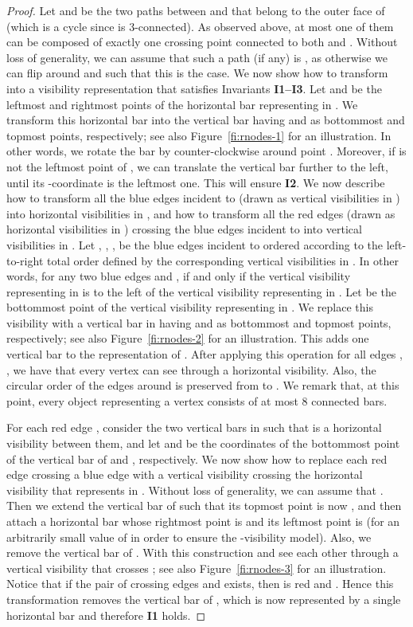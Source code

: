 \documentclass{article}
\begin{document}
\begin{proof}
Let  and  be the two paths between  and  that belong to the outer face of  (which is a cycle since  is 3-connected). As observed above, at most one of them can be composed of exactly one crossing point  connected to both  and .  Without loss of generality, we can assume that such a path (if any) is , as otherwise we can flip  around  and  such that this is the case. We now show how to transform  into a visibility representation  that satisfies Invariants {\bf I1--I3}. Let  and  be the leftmost and rightmost points of the horizontal bar representing  in . We transform this horizontal bar into the vertical bar having  and   as bottommost and topmost points, respectively; see also Figure~\ref{fi:rnodes-1} for an illustration. In other words, we rotate the bar by  counter-clockwise around point . Moreover, if  is not the leftmost point of , we can translate the vertical bar further to the left, until its -coordinate is the leftmost one. This will ensure {\bf I2}. We now describe how to transform all the blue edges incident to  (drawn as vertical visibilities in ) into horizontal visibilities in , and how to transform all the red edges (drawn as horizontal visibilities in ) crossing the blue edges incident to  into vertical visibilities in . Let , , , be the  blue edges incident to  ordered according to the left-to-right total order defined by the corresponding vertical visibilities in . In other words, for any two blue edges  and ,  if and only if the vertical visibility representing   in  is to the left of the vertical visibility representing  in .  Let  be the bottommost point of the vertical visibility representing  in . We replace this visibility with a vertical bar in  having  and  as bottommost and topmost points, respectively; see also Figure~\ref{fi:rnodes-2} for an illustration. This adds one vertical bar to the representation of . After applying this operation for all edges  , , we have that every vertex  can see  through a horizontal visibility. Also, the circular order of the edges around  is preserved from  to . We remark that, at this point, every object representing a vertex consists of at most 8 connected bars.

For each red edge , consider the two vertical bars in  such that  is a horizontal visibility between them, and let  and  be the coordinates of the bottommost point of the vertical bar of  and , respectively. We now show how to replace each red edge  crossing a blue edge  with a vertical visibility crossing the horizontal visibility that represents  in . Without loss of generality, we can assume that . Then we extend the vertical bar of  such that its topmost point is now , and then attach a horizontal bar whose rightmost point is  and its leftmost point is  (for an arbitrarily small value of  in order to ensure the -visibility model). Also, we remove the vertical bar of . With this construction   and  see each other through a vertical visibility that crosses ; see also Figure~\ref{fi:rnodes-3} for an illustration. Notice that if the pair of crossing edges   and  exists, then  is red and . Hence this transformation removes the vertical bar of , which is now represented by a single horizontal bar and therefore {\bf I1} holds.



\end{proof}
\end{document}
